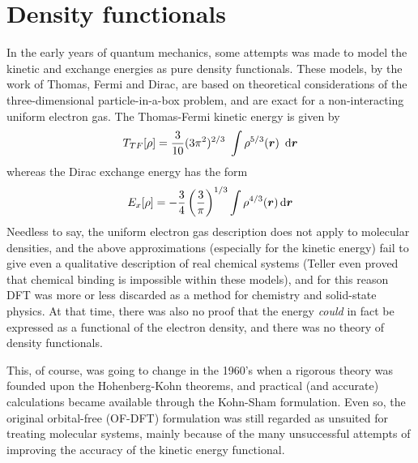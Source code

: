 \section{Density functionals}
In the early years of quantum mechanics, some attempts was made to model the kinetic and exchange energies
as pure density functionals. These models, by the work of Thomas\cite{Thomas:1927}, Fermi\cite{Fermi:1927} and 
Dirac\cite{Dirac:1929}, 
are based on theoretical considerations of the three-dimensional particle-in-a-box problem, and are exact for a 
non-interacting uniform electron gas. The Thomas-Fermi kinetic energy is given by
\begin{equation}
    \label{eq:thomas-fermi}
    T_{TF}[\rho] = \frac{3}{10}(3\pi^2)^{2/3} \int \rho^{5/3}(\bs{r}) \ud \bs{r}
\end{equation}
whereas the Dirac exchange energy has the form
\begin{equation}
    \label{eq:dirac}
    E_x[\rho] = -\frac{3}{4}\left(\frac{3}{\pi}\right)^{1/3} \int \rho^{4/3}(\boldsymbol r) \,\mathrm{d} \boldsymbol r
\end{equation}
Needless to say, the uniform electron gas description does not apply to molecular densities, and the above
approximations (especially for the kinetic energy) fail to give even a qualitative description of real chemical 
systems (Teller\cite{Teller:1962} even proved that chemical binding is impossible within these models), and for this 
reason DFT was more or less discarded as a method for chemistry and solid-state physics. At that time, there was 
also no proof that the energy \emph{could} in fact be expressed as a functional of the electron density, 
and there was no theory of density functionals. 

This, of course, was going to change in the 1960's when a rigorous
theory was founded upon the Hohenberg-Kohn theorems, and practical (and accurate) calculations became available
through the Kohn-Sham formulation. Even so, the original orbital-free (OF-DFT) formulation was still regarded as
unsuited for treating molecular systems, mainly because of the many unsuccessful attempts of improving the accuracy 
of the kinetic energy functional.

